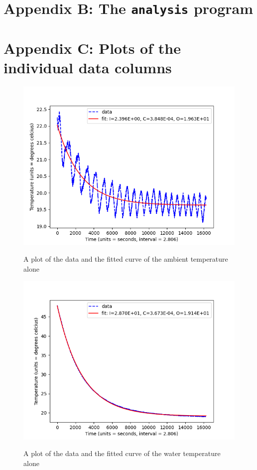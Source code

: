 \documentclass[12pt]{article}
\begin{document}


\section{Appendix B: The \texttt{analysis} program} \label{apxB}



\section{Appendix C: Plots of the individual data columns}

\begin{figure}
	\includegraphics[scale=0.8]{Figure_2.png}
	\centering
	\label{fig4}
	\caption{A plot of the data and the fitted curve of the ambient temperature alone}
\end{figure}


\begin{figure}
	\includegraphics[scale=0.8]{Figure_3.png}
	\centering
	\label{fig5}
	\caption{A plot of the data and the fitted curve of the water temperature alone}
\end{figure}

\pagebreak



\end{document}
